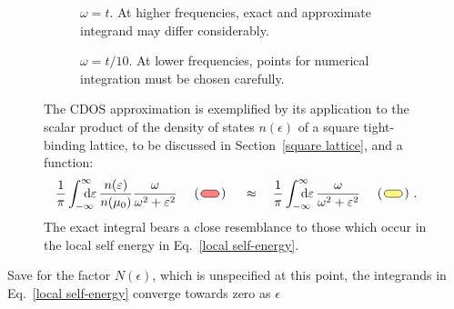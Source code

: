\begin{figure}[b]
    \small
    \begin{subfigure}{6.75cm}
        
        \caption{$\omega = t$. At higher frequencies, exact and approximate
                 integrand may differ considerably.}
    \end{subfigure}%
    \hfill%
    \begin{subfigure}{6.75cm}
        
        \caption{$\omega = t / 10$. At lower frequencies, points for numerical
                 integration must be chosen carefully.}
        \label{CDOS at low frequencies}
    \end{subfigure}
    \captionsetup{singlelinecheck=off}
    \caption[CDOS approximation]{ %
        The CDOS approximation is exemplified by its application to the scalar
        product of the density of states $n(\epsilon)$ of a square tight-binding
        lattice, to be discussed in Section~\ref{square lattice}, and a
         function:
        \begin{align*}
            \frac 1 \pi \int \from{-\infty} \till \infty \D \epsilon \,
            \frac {n(\epsilon)}{n(\mu_0)} \frac \omega {\omega^2 + \epsilon^2}
            \quad
            \begin{tikzpicture}[baseline]
                \draw [fill=red!50, rounded corners=3pt]
                    (0, 0) rectangle (0.5, 0.2);
                \node [left=-2pt] at (0, 0.1) {(};
                \node [right=-2pt] at (0.5, 0.1) {)};
            \end{tikzpicture}
            \quad \approx \quad
            \frac 1 \pi  \int \from{-\infty} \till \infty \D \epsilon \,
            \frac \omega {\omega^2 + \epsilon^2}
            \quad
            \begin{tikzpicture}[baseline]
                \draw [fill=yellow!50, rounded corners=3pt]
                    (0, 0) rectangle (0.5, 0.2);
                \node [left=-2pt] at (0, 0.1) {(};
                \node [right=-2pt] at (0.5, 0.1) {)};
            \end{tikzpicture}.
        \end{align*}
        The exact integral bears a close resemblance to those which occur in the
        local self energy in Eq.~\ref{local self-energy}.
        }
    \label{CDOS approximation}
\end{figure}
%
Save for the factor $N(\epsilon)$, which is unspecified at this point, the
integrands in Eq.~\ref{local self-energy} converge towards zero as $\epsilon$
